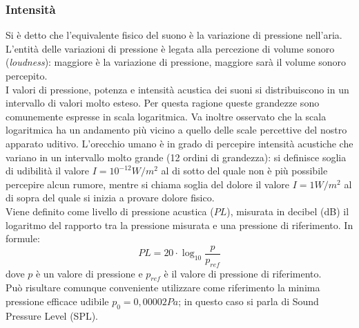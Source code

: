 \documentclass[12pt]{report}
\begin{document}
		\subsubsection{Intensità}
		\label{cap2sec1_1_3}
		Si è detto che l'equivalente fisico del suono è la variazione di pressione nell'aria. L'entità delle variazioni di pressione è legata alla percezione di volume sonoro ({\itshape loudness}): maggiore è la variazione di pressione, maggiore sarà il volume sonoro percepito.\\
I valori di pressione, potenza e intensità acustica dei suoni si distribuiscono in un intervallo di valori molto esteso. Per questa ragione queste grandezze sono comunemente espresse in scala logaritmica.
Va inoltre osservato che la scala logaritmica ha un andamento più vicino a quello delle scale percettive del nostro apparato uditivo.
L'orecchio umano è in grado di percepire intensità acustiche che variano in un intervallo molto grande (12 ordini di grandezza): si definisce soglia di udibilità il valore $I = 10^{-12} W/m^2$ al di sotto del quale non è più possibile percepire alcun rumore, mentre si chiama soglia del dolore il valore $I = 1 W/m^2$ al di sopra del quale si inizia a provare dolore fisico.\\
Viene definito come livello di pressione acustica ($PL$), misurata in decibel (dB) il logaritmo del rapporto tra la pressione misurata e una pressione di riferimento. In formule:
$$ PL = 20 \cdot \log_{10} \frac{p}{p_{ref}}   $$
dove $p$ è un valore di pressione e $p_{ref}$ è il valore di pressione di riferimento.\\
Può risultare comunque conveniente utilizzare come riferimento la minima pressione efficace udibile $p_0 = 0,00002 Pa$; in questo caso si parla di Sound Pressure Level (SPL).

\clearpage
\end{document}
